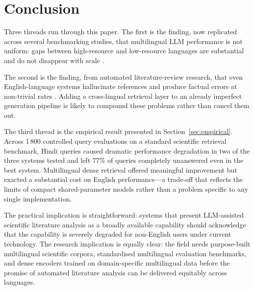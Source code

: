 \documentclass[acmsmall,screen,review]{acmart}
\begin{document}

\section{Conclusion}
\label{sec:conclusion}

Three threads run through this paper.  The first is the finding, now
replicated across several benchmarking studies, that multilingual LLM
performance is not uniform: gaps between high-resource and low-resource
languages are substantial and do not disappear with scale
\citep{hu2020xtreme,qi2023crosslingual,xuan2025mmlupro}.

The second is the finding, from automated literature-review research, that
even English-language systems hallucinate references and produce factual
errors at non-trivial rates \citep{tang2025automated,wu2025automated}.
Adding a cross-lingual retrieval layer to an already imperfect generation
pipeline is likely to compound these problems rather than cancel them out.

The third thread is the empirical result presented in
Section~\ref{sec:empirical}.  Across 1\,800 controlled query evaluations
on a standard scientific retrieval benchmark, Hindi queries caused dramatic
performance degradation in two of the three systems tested and left 77\%
of queries completely unanswered even in the best system.  Multilingual
dense retrieval offered meaningful improvement but exacted a substantial
cost on English performance---a trade-off that reflects the limits of
compact shared-parameter models rather than a problem specific to any
single implementation.

The practical implication is straightforward: systems that present
LLM-assisted scientific literature analysis as a broadly available
capability should acknowledge that the capability is severely degraded for
non-English users under current technology.  The research implication is
equally clear: the field needs purpose-built multilingual scientific
corpora, standardised multilingual evaluation benchmarks, and dense
encoders trained on domain-specific multilingual data before the promise
of automated literature analysis can be delivered equitably across
languages.




\end{document}
